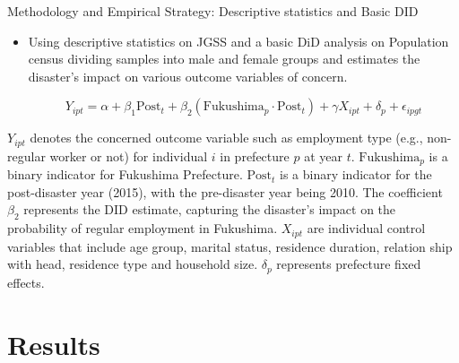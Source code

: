 \documentclass[serif, aspectratio=169]{beamer}
\begin{document}
\begin{frame}{Methodology and Empirical Strategy: Descriptive statistics and Basic DID}
    \begin{itemize}
    \item  Using descriptive statistics on JGSS and a basic DiD analysis on Population census dividing samples into male and female groups and estimates the disaster's impact on various outcome variables of concern.

\begin{equation}
Y_{ipt} = \alpha + \beta_1 \text{Post}_t + \beta_2 (\text{Fukushima}_p \cdot \text{Post}_t) + \gamma X_{ipt} + \delta_p + \epsilon_{ipgt}
\end{equation}

\end{itemize}


$Y_{ipt}$ denotes the concerned outcome variable such as employment type (e.g., non-regular worker or not) for individual $i$ in prefecture $p$ at year $t$. $\text{Fukushima}_p$ is a binary indicator for Fukushima Prefecture. $\text{Post}_t$ is a binary indicator for the post-disaster year (2015), with the pre-disaster year being 2010. The coefficient $\beta_2$ represents the DID estimate, capturing the disaster's impact on the probability of regular employment in Fukushima. $X_{ipt}$ are individual control variables that include age group, marital status, residence duration, relation ship with head, residence type and household size. $\delta_p$ represents prefecture fixed effects.



\end{frame}


\section{Results}
\end{document}
